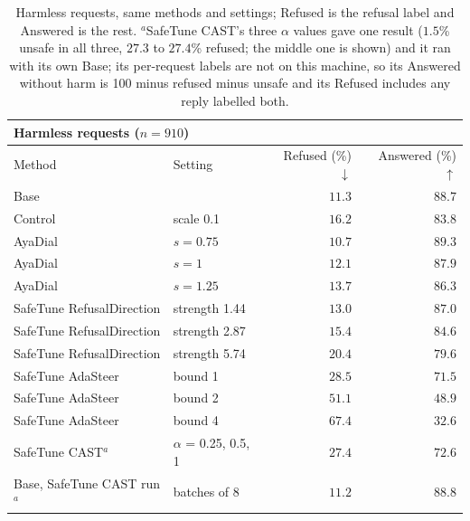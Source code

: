 \documentclass[10pt,a4paper]{article}
\renewcommand{\arraystretch}{1.12}
\begin{document}
\begin{table}[H]\centering\small\renewcommand{\arraystretch}{1.25}\begin{tabular}{|l|l|r|r|}\hline
\multicolumn{4}{|l|}{\textbf{Harmless requests ($n = 910$)}}\\\hline
Method & Setting & Refused (\%) $\downarrow$ & Answered (\%) $\uparrow$\\\hline
Base &  & $11.3$ & $88.7$\\\hline
Control & scale 0.1 & $16.2$ & $83.8$\\\hline
AyaDial & $s = 0.75$ & \cellcolor{win}$\mathbf{10.7}$ & \cellcolor{win}$\mathbf{89.3}$\\\hline
AyaDial & $s = 1$ & $12.1$ & $87.9$\\\hline
AyaDial & $s = 1.25$ & $13.7$ & $86.3$\\\hline
SafeTune RefusalDirection & strength 1.44 & $13.0$ & $87.0$\\\hline
SafeTune RefusalDirection & strength 2.87 & $15.4$ & $84.6$\\\hline
SafeTune RefusalDirection & strength 5.74 & $20.4$ & $79.6$\\\hline
SafeTune AdaSteer & bound 1 & $28.5$ & $71.5$\\\hline
SafeTune AdaSteer & bound 2 & $51.1$ & $48.9$\\\hline
SafeTune AdaSteer & bound 4 & $67.4$ & $32.6$\\\hline
SafeTune CAST$^{a}$ & $\alpha$ = 0.25, 0.5, 1 & $27.4$ & $72.6$\\\hline
Base, SafeTune CAST run$^{a}$ & batches of 8 & $11.2$ & $88.8$\\\hline
\end{tabular}
\caption{Harmless requests, same methods and settings; Refused is the refusal label and Answered is the rest. $^{a}$SafeTune CAST's three $\alpha$ values gave one result ($1.5$\% unsafe in all three, $27.3$ to $27.4$\% refused; the middle one is shown) and it ran with its own Base; its per-request labels are not on this machine, so its Answered without harm is 100 minus refused minus unsafe and its Refused includes any reply labelled both.}\label{tab:mainb}\end{table}
\end{document}
